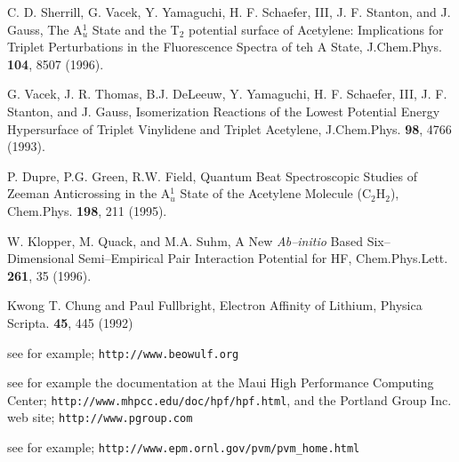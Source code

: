 \begin{thebibliography}{999}
C. D. Sherrill, G. Vacek, Y. Yamaguchi, H. F. Schaefer, III, 
J. F. Stanton, and J. Gauss,
The A$^1_u$ State and the T$_2$ potential surface
of Acetylene: Implications for Triplet Perturbations in the
Fluorescence Spectra of teh A State,
J.Chem.Phys. {\bf 104}, 8507 (1996).

G. Vacek, J. R. Thomas, B.J. DeLeeuw, Y. Yamaguchi, H. F. Schaefer, III, 
J. F. Stanton, and J. Gauss,
Isomerization Reactions of the Lowest Potential
Energy Hypersurface of Triplet Vinylidene and Triplet Acetylene,
J.Chem.Phys. {\bf 98}, 4766 (1993).

P. Dupre, P.G. Green, R.W. Field, 
Quantum Beat Spectroscopic Studies of Zeeman Anticrossing
in the A$^1_u$ State of the Acetylene Molecule
(C$_2$H$_2$),
Chem.Phys. {\bf 198}, 211 (1995). 

W. Klopper, M. Quack, and M.A. Suhm,
A New {\it Ab--initio} Based Six--Dimensional Semi--Empirical Pair
Interaction Potential for HF,
Chem.Phys.Lett. {\bf 261}, 35 (1996).

Kwong T. Chung and Paul Fullbright,
Electron Affinity of Lithium,
Physica Scripta. {\bf 45}, 445 (1992)

see for example; {\tt http://www.beowulf.org}

see for example the documentation at the 
Maui High Performance Computing Center;
{\tt http://www.mhpcc.edu/doc/hpf/hpf.html},
and the Portland Group Inc. web site;
{\tt http://www.pgroup.com}

see for example; {\tt http://www.epm.ornl.gov/pvm/pvm_home.html}


\end{thebibliography}




